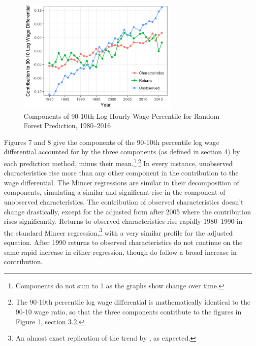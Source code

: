 \documentclass[notitlepage,12pt]{article}
\begin{document}
\begin{figure}[htb!]
  \centering
  \includegraphics[width=0.7\textwidth]{edit3.png}
  \caption{Components of 90-10th Log Hourly Wage Percentile for Random Forest Prediction, 1980--2016}
\end{figure}

Figures 7 and 8 give the components of the 90-10th percentile log wage differential accounted for by the three components (as defined in section 4) by each prediction method, minus their mean.\footnote{Components do not sum to 1 as the graphs show change over time.}$^{,}$\footnote{The 90-10th percentile log wage differential is mathematically identical to the 90-10 wage ratio, so that the three components contribute to the figures in Figure 1, section 3.2.}  In every instance, unobserved characteristics rise more than any other component in the contribution to the wage differential.  The Mincer regressions are similar in their decomposition of components, simulating a similar and significant rise in the component of unobserved characteristics.  The contribution of observed characteristics doesn't change drastically, except for the adjusted form after 2005 where the contribution rises significantly.  Returns to observed characteristics rise rapidly 1980--1990 in the standard Mincer regression,\footnote{An almost exact replication of the trend by \cite{juhn1993wage}, as expected.} with a very similar profile for the adjusted equation.  After 1990 returns to observed characteristics do not continue on the same rapid increase in either regression, though do follow a broad increase in contribution.
\end{document}
